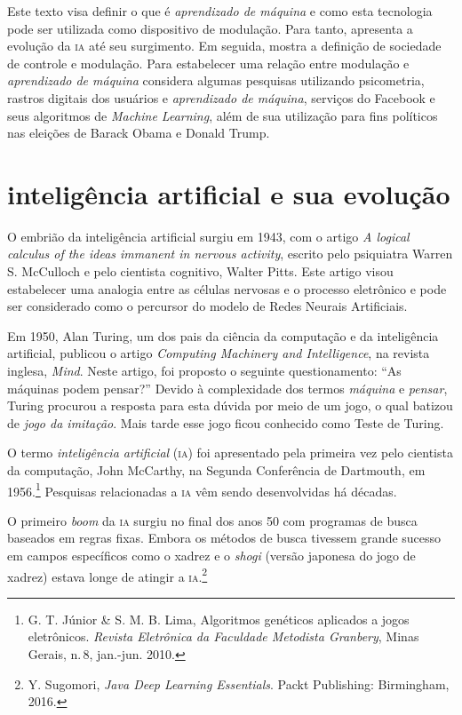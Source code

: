 Este texto visa definir o que é \textit{aprendizado de máquina} e como esta tecnologia pode ser utilizada como dispositivo de modulação. Para tanto, apresenta a evolução da \textsc{ia} até seu surgimento. Em seguida, mostra a definição de sociedade de controle e modulação. Para estabelecer uma relação entre modulação e \textit{aprendizado de máquina} considera algumas pesquisas utilizando psicometria, rastros digitais dos usuários e \textit{aprendizado de máquina}, serviços do Facebook e seus algoritmos de \textit{Machine Learning}, além de sua utilização para fins políticos nas eleições de Barack Obama e Donald Trump.

\section{inteligência artificial e sua evolução}

O embrião da inteligência artificial surgiu em 1943, com o artigo
\textit{A logical calculus of the ideas immanent in nervous activity},
escrito pelo psiquiatra Warren S. McCulloch e
pelo cientista cognitivo, Walter Pitts. Este artigo visou estabelecer
uma analogia entre as células nervosas e o processo eletrônico e pode ser considerado como o percursor do modelo de Redes Neurais Artificiais.

Em 1950, Alan Turing, um dos pais da ciência da computação e da
inteligência artificial, publicou o artigo \textit{Computing Machinery
and Intelligence}, na revista inglesa, \textit{Mind}.
Neste artigo, foi proposto o seguinte questionamento: ``As máquinas
podem pensar?'' Devido à complexidade dos termos \textit{máquina} e
\textit{pensar}, Turing procurou a resposta para esta dúvida por meio de um
jogo, o qual batizou de \textit{jogo da imitação}. Mais tarde
esse jogo ficou conhecido como Teste de Turing.

O termo \textit{inteligência artificial} (\textsc{ia}) foi apresentado pela primeira vez
pelo cientista da computação, John McCarthy, na Segunda Conferência de
Dartmouth, em 1956.\footnote{G. T. Júnior \& S. M. B. Lima, Algoritmos genéticos aplicados a jogos eletrônicos. \textit{Revista Eletrônica da Faculdade Metodista Granbery}, Minas Gerais, n.\,8, jan.-jun. 2010.} Pesquisas relacionadas a \textsc{ia} vêm sendo desenvolvidas há décadas.

O primeiro \textit{boom} da \textsc{ia} surgiu no final dos anos 50 com programas
de busca baseados em regras fixas. Embora os métodos de busca tivessem
grande sucesso em campos específicos como o xadrez e o \textit{shogi} (versão
japonesa do jogo de xadrez) estava longe de atingir a \textsc{ia}.\footnote{Y. Sugomori, \textit{Java Deep Learning Essentials}. Packt
Publishing: Birmingham, 2016.}

